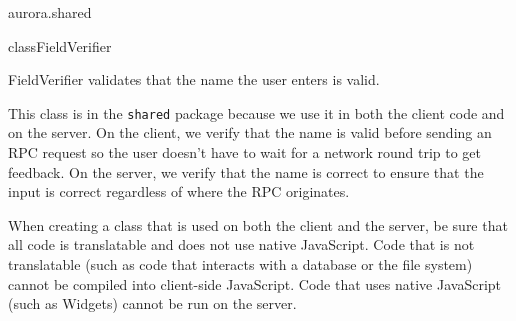 \begin{texdocpackage}{aurora.shared}
\label{texdoclet:aurora.shared}

\begin{texdocclass}{class}{FieldVerifier}
\label{texdoclet:aurora.shared.FieldVerifier}
\begin{texdocclassintro}
\begin{texdocp}
 FieldVerifier validates that the name the user enters is valid.
 \end{texdocp}
 \begin{texdocp}
 This class is in the \texttt{shared} package because we use it in both
 the client code and on the server. On the client, we verify that the name is
 valid before sending an RPC request so the user doesn't have to wait for a
 network round trip to get feedback. On the server, we verify that the name is
 correct to ensure that the input is correct regardless of where the RPC
 originates.
 \end{texdocp}
 \begin{texdocp}
 When creating a class that is used on both the client and the server, be sure
 that all code is translatable and does not use native JavaScript. Code that
 is not translatable (such as code that interacts with a database or the file
 system) cannot be compiled into client-side JavaScript. Code that uses native
 JavaScript (such as Widgets) cannot be run on the server.
 \end{texdocp}\end{texdocclassintro}
\begin{texdocclassconstructors}
\end{texdocclassconstructors}
\begin{texdocclassmethods}
\end{texdocclassmethods}
\end{texdocclass}


\end{texdocpackage}




